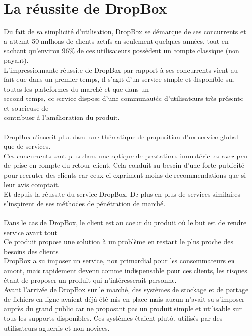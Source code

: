 \documentclass[a4paper, 10pt]{article}
\begin{document}
\section*{La r\'eussite de DropBox}
Du fait de sa simplicit\'e d'utilisation, DropBox se d\'emarque de ses concurrents et
a atteint 50 millions de clients actifs en seulement quelques ann\'ees,
tout en sachant qu'environ 96\% de ces utilisateurs poss\`edent un compte classique (non payant).\\
L'impressionnante r\'eussite de DropBox par rapport \`a ses concurrents vient du fait que dans un premier temps,
il s'agit d'un service simple et disponible sur toutes les plateformes du march\'e et
que dans un\\second temps, ce service dispose d'une communaut\'ee d'utilisateurs tr\`es pr\'esente et soucieuse
de\\contribuer \`a l'am\'elioration du produit.\\ \\
DropBox s'inscrit plus dans une th\'ematique de proposition d'un service global que de services.\\
Ces concurrents sont plus dans une optique de prestations immat\'erielles avec peu de prise en compte du retour client.
Cela conduit au besoin d'une forte publicit\'e pour recruter des clients
car ceux-ci expriment moins de recommendations que si leur avis comptait.\\
Et depuis la r\'eussite du service DropBox,
De plus en plus de services similaires s'inspirent de ses m\'ethodes de p\'en\'etration de march\'e.\\ \\
Dans le cas de DropBox, le client est au coeur du produit o\`u le but est de rendre service avant tout.\\
Ce produit propose une solution \`a un probl\`eme en restant le plus proche des besoins des clients.\\
DropBox a su imposer un service, non primordial pour les consommateurs en amont,
mais rapidement devenu comme indispensable pour ces clients, les risques \'etant de proposer un produit qui n'int\'eresserait personne.\\
Avant l'arriv\'ee de DropBox sur le march\'e, des syst\`emes de stockage et de partage de fichiers en ligne avaient d\'ej\`a \'et\'e mis en place
mais aucun n'avait su s'imposer aupr\`es du grand public car ne proposant pas un produit simple et utilisable sur tous les supports disponibles.
Ces syst\`emes \'etaient plut\^ot utilis\'es par des utilisateurs aguerris et non novices.\\ \\
\end{document}
